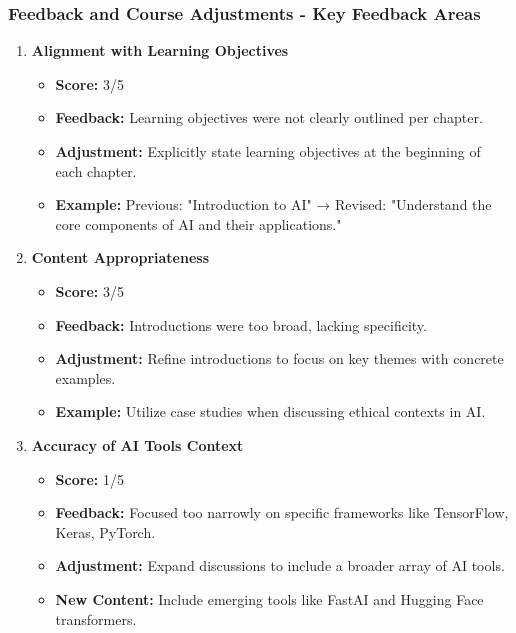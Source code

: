 \documentclass[aspectratio=169]{beamer}
\begin{document}
\begin{frame}[fragile]
    \frametitle{Feedback and Course Adjustments - Key Feedback Areas}
    \begin{enumerate}
        \item \textbf{Alignment with Learning Objectives}
            \begin{itemize}
                \item \textbf{Score:} 3/5
                \item \textbf{Feedback:} Learning objectives were not clearly outlined per chapter.
                \item \textbf{Adjustment:} Explicitly state learning objectives at the beginning of each chapter.
                \item \textbf{Example:} Previous: "Introduction to AI" → Revised: "Understand the core components of AI and their applications."
            \end{itemize}
        \item \textbf{Content Appropriateness}
            \begin{itemize}
                \item \textbf{Score:} 3/5
                \item \textbf{Feedback:} Introductions were too broad, lacking specificity.
                \item \textbf{Adjustment:} Refine introductions to focus on key themes with concrete examples.
                \item \textbf{Example:} Utilize case studies when discussing ethical contexts in AI.
            \end{itemize}
        \item \textbf{Accuracy of AI Tools Context}
            \begin{itemize}
                \item \textbf{Score:} 1/5
                \item \textbf{Feedback:} Focused too narrowly on specific frameworks like TensorFlow, Keras, PyTorch.
                \item \textbf{Adjustment:} Expand discussions to include a broader array of AI tools.
                \item \textbf{New Content:} Include emerging tools like FastAI and Hugging Face transformers.
            \end{itemize}
    \end{enumerate}
\end{frame}
\end{document}
